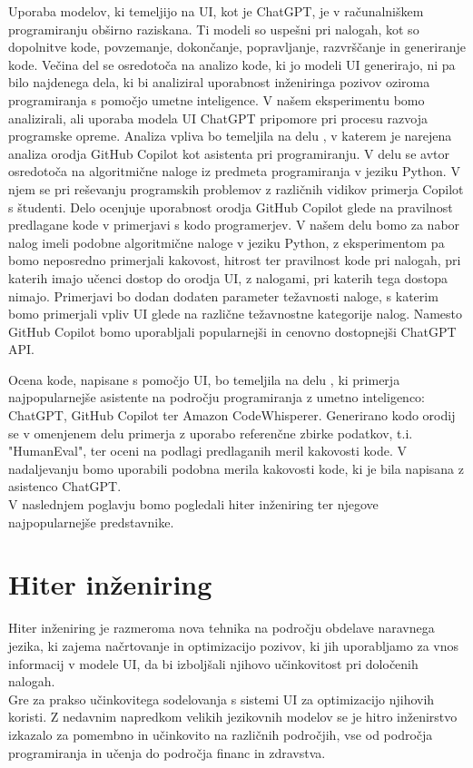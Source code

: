 \documentclass[a4paper,12pt,openright]{book}
\begin{document}
Uporaba modelov, ki temeljijo na UI, kot je ChatGPT, je v računalniškem programiranju obširno raziskana. Ti modeli so uspešni pri nalogah, kot so dopolnitve kode, povzemanje, dokončanje, popravljanje, razvrščanje in generiranje kode. \cite{rudolph2023war} Večina del se osredotoča na analizo kode, ki jo modeli UI generirajo, ni pa bilo najdenega dela, ki bi analiziral uporabnost inženiringa pozivov oziroma programiranja s pomočjo umetne inteligence. V našem eksperimentu bomo analizirali, ali uporaba modela UI ChatGPT pripomore pri procesu razvoja programske opreme.
\newline
Analiza vpliva bo temeljila na delu \cite{MORADIDAKHEL2023111734}, v katerem je narejena analiza orodja GitHub Copilot kot asistenta pri programiranju. V delu se avtor osredotoča na algoritmične naloge iz predmeta programiranja v jeziku Python. V njem se pri reševanju programskih problemov z različnih vidikov primerja Copilot s študenti. Delo ocenjuje uporabnost orodja GitHub Copilot glede na pravilnost predlagane kode v primerjavi s kodo programerjev.
V našem delu bomo za nabor nalog imeli podobne algoritmične naloge v jeziku Python, z eksperimentom pa bomo neposredno primerjali kakovost, hitrost ter pravilnost kode pri nalogah, pri katerih imajo učenci dostop do orodja UI, z nalogami, pri katerih tega dostopa nimajo. Primerjavi bo dodan dodaten parameter težavnosti naloge, s katerim bomo primerjali vpliv UI glede na različne težavnostne kategorije nalog. Namesto GitHub Copilot bomo uporabljali popularnejši in cenovno dostopnejši ChatGPT API. 

Ocena kode, napisane s pomočjo UI, bo temeljila na delu \cite{yetistiren2023evaluating}, ki primerja najpopularnejše asistente na področju programiranja z umetno inteligenco: ChatGPT, GitHub Copilot ter Amazon CodeWhisperer. Generirano kodo orodij se v omenjenem delu primerja z uporabo referenčne zbirke podatkov, t.i. "HumanEval", ter oceni na podlagi predlaganih meril kakovosti kode. V nadaljevanju bomo uporabili podobna merila kakovosti kode, ki je bila napisana z asistenco ChatGPT. \cite{7577432} \\
V naslednjem poglavju bomo pogledali hiter inženiring ter njegove najpopularnejše predstavnike.


\chapter{Hiter inženiring}

Hiter inženiring je razmeroma nova tehnika na področju obdelave naravnega jezika, ki zajema načrtovanje in optimizacijo pozivov, ki jih uporabljamo za vnos informacij v modele UI, da bi izboljšali njihovo učinkovitost pri določenih nalogah. \cite{wang2024prompt} \\
Gre za prakso učinkovitega sodelovanja s sistemi UI za optimizacijo njihovih koristi. Z nedavnim napredkom velikih jezikovnih modelov se je hitro inženirstvo izkazalo za pomembno in učinkovito na različnih področjih, vse od področja programiranja in učenja do področja financ in zdravstva. \cite{info:doi/10.2196/50638} \\
\end{document}
